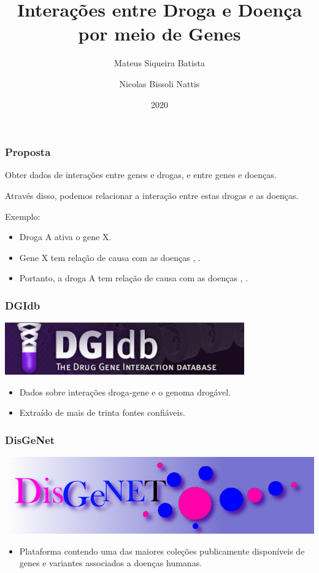\documentclass[12pt]{beamer}
\title{Interações entre Droga e Doença por meio de Genes}
\author{
  Mateus Siqueira Batista\and
  Nicolas Bissoli Nattis
}
\institute{
  MC536 - Instituto de Computação, UNICAMP
}
\date[2020]{2020}
\begin{document}
\frame{\titlepage}

\begin{frame}
  \frametitle{Proposta}
  Obter dados de interações entre genes e drogas, e entre genes e doenças.
  \pause

  Através disso, podemos relacionar a interação entre estas drogas e as doenças.
  \pause

  \begin{block}{Exemplo:}
    \begin{itemize}
      \item Droga A ativa o gene X.
      \item Gene X tem relação de causa com as doenças \textalpha, \textgamma.
      \item Portanto, a droga A tem relação de causa com as doenças \textalpha, \textgamma.
    \end{itemize}
  \end{block}
\end{frame}

\begin{frame}
  \frametitle{DGIdb}
  \centering
  \includegraphics[scale=0.5]{dgi}
  \vspace*{1 cm}
  \begin{itemize}
    \item Dados sobre interações droga-gene e o genoma drogável.
    \item Extraído de mais de trinta fontes confiáveis.
  \end{itemize}
\end{frame}

\begin{frame}
  \frametitle{DisGeNet}
  \centering
  \includegraphics[scale=0.25]{disgenet}
  \vspace*{1 cm}
  \begin{itemize}
    \item Plataforma contendo uma das maiores coleções publicamente disponíveis
          de genes e variantes associados a doenças humanas.
  \end{itemize}
\end{frame}
\end{document}
